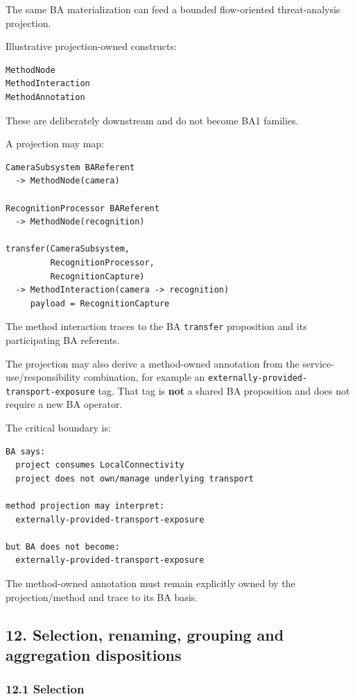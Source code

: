 \documentclass[11pt,a4paper]{article}
\begin{document}
The same BA materialization can feed a bounded flow-oriented threat-analysis projection.

Illustrative projection-owned constructs:

\begin{verbatim}
MethodNode
MethodInteraction
MethodAnnotation
\end{verbatim}

These are deliberately downstream and do not become BA1 families.

A projection may map:

\begin{verbatim}
CameraSubsystem BAReferent
  -> MethodNode(camera)

RecognitionProcessor BAReferent
  -> MethodNode(recognition)

transfer(CameraSubsystem,
         RecognitionProcessor,
         RecognitionCapture)
  -> MethodInteraction(camera -> recognition)
     payload = RecognitionCapture
\end{verbatim}

The method interaction traces to the BA \texttt{transfer} proposition and its participating BA referents.

The projection may also derive a method-owned annotation from the service-use/responsibility combination, for example an \texttt{externally-provided-transport-exposure} tag. That tag is \textbf{not} a shared BA proposition and does not require a new BA operator.

The critical boundary is:

\begin{verbatim}
BA says:
  project consumes LocalConnectivity
  project does not own/manage underlying transport

method projection may interpret:
  externally-provided-transport-exposure

but BA does not become:
  externally-provided-transport-exposure
\end{verbatim}

The method-owned annotation must remain explicitly owned by the projection/method and trace to its BA basis.

\subsection{12. Selection, renaming, grouping and aggregation dispositions}\label{12-selection-renaming-grouping-and-aggregation-dispositions}

\subsubsection{12.1 Selection}\label{121-selection}
\end{document}
